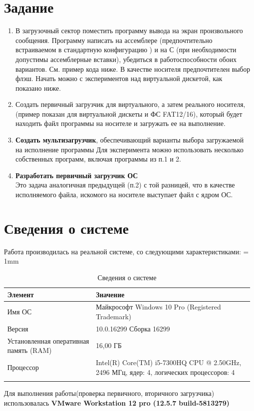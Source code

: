  


\tableofcontents
\clearpage

%
\section{Задание}
\begin{enumerate}
\item В загрузочный сектор поместить программу вывода на экран произвольного сообщения. Программу написать на ассемблере (предпочтительно встраиваемом в стандартную конфигурацию ) и на С (при необходимости допустимы ассемблерные вставки), убедиться в работоспособности обоих вариантов. См. пример кода ниже. В качестве носителя предпочтителен выбор флэш. Начать можно с экспериментов над виртуальной дискетой, как показано ниже.
\item Создать первичный загрузчик для виртуального, а затем реального носителя, (пример показан для виртуальной дискеты и ФС FAT12/16), который будет находить файл программы на носителе и загружать ее на выполнение.
\item \textbf{Создать мультизагрузчик}, обеспечивающий варианты выбора загружаемой на исполнение программы Для эксперимента можно использовать несколько собственных программ, включая программы из п.1 и 2.
\item \textbf{Разработать первичный загрузчик ОС}\\Это задача аналогичная предыдущей (п.2) с той разницей, что в качестве исполняемого файла, искомого на носителе выступает файл с ядром ОС.
\end{enumerate}

\section{Сведения о системе}
Работа производилась на реальной системе, со следующими характеристиками:
\tabulinesep = 1mm
\begin{longtabu} to \textwidth {|X[10, c , m ] |X[25, c , m ] | }\firsthline\hline

\textbf{Элемент}&\textbf{Значение}\\ \hline \endfirsthead
	
Имя ОС&Майкрософт Windows 10 Pro (Registered Trademark)\\ \hline
Версия&10.0.16299 Сборка 16299\\ \hline
Установленная оперативная память (RAM) &16,00 ГБ\\ \hline
Процессор&Intel(R) Core(TM) i5-7300HQ CPU @ 2.50GHz, 2496 МГц, ядер: 4, логических процессоров: 4\\ \hline
\caption{Сведения о системе}
\end{longtabu}
Для выполнения работы(проверка первичного, вторичного загрузчика) использовалась \textbf{VMware Workstation 12 pro (12.5.7 build-5813279)}

